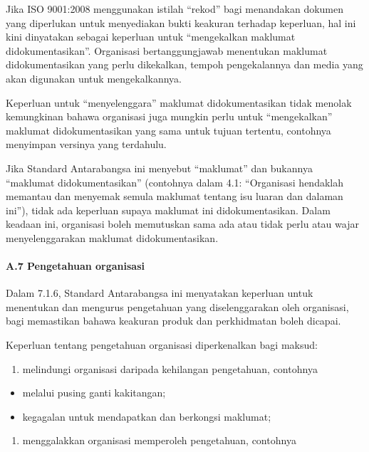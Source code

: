 \documentclass[
]{article}
\providecommand{\tightlist}{%
  \setlength{\itemsep}{0pt}\setlength{\parskip}{0pt}}
\begin{document}
Jika ISO 9001:2008 menggunakan istilah ``rekod'' bagi menandakan dokumen
yang diperlukan untuk menyediakan bukti keakuran terhadap keperluan, hal
ini kini dinyatakan sebagai keperluan untuk ``mengekalkan maklumat
didokumentasikan''. Organisasi bertanggungjawab menentukan maklumat
didokumentasikan yang perlu dikekalkan, tempoh pengekalannya dan media
yang akan digunakan untuk mengekalkannya.

Keperluan untuk ``menyelenggara'' maklumat didokumentasikan tidak
menolak kemungkinan bahawa organisasi juga mungkin perlu untuk
``mengekalkan'' maklumat didokumentasikan yang sama untuk tujuan
tertentu, contohnya menyimpan versinya yang terdahulu.

Jika Standard Antarabangsa ini menyebut ``maklumat'' dan bukannya
``maklumat didokumentasikan'' (contohnya dalam 4.1: ``Organisasi
hendaklah memantau dan menyemak semula maklumat tentang isu luaran dan
dalaman ini''), tidak ada keperluan supaya maklumat ini
didokumentasikan. Dalam keadaan ini, organisasi boleh memutuskan sama
ada atau tidak perlu atau wajar menyelenggarakan maklumat
didokumentasikan.

\hypertarget{a.7-pengetahuan-organisasi}{%
\paragraph{A.7 Pengetahuan
organisasi}\label{a.7-pengetahuan-organisasi}}

Dalam 7.1.6, Standard Antarabangsa ini menyatakan keperluan untuk
menentukan dan mengurus pengetahuan yang diselenggarakan oleh
organisasi, bagi memastikan bahawa keakuran produk dan perkhidmatan
boleh dicapai.

Keperluan tentang pengetahuan organisasi diperkenalkan bagi maksud:

\begin{enumerate}
\def\labelenumi{\alph{enumi})}
\tightlist
\item
  melindungi organisasi daripada kehilangan pengetahuan, contohnya
\end{enumerate}

\begin{itemize}
\tightlist
\item
  melalui pusing ganti kakitangan;
\item
  kegagalan untuk mendapatkan dan berkongsi maklumat;
\end{itemize}

\begin{enumerate}
\def\labelenumi{\alph{enumi})}
\setcounter{enumi}{1}
\tightlist
\item
  menggalakkan organisasi memperoleh pengetahuan, contohnya
\end{enumerate}
\end{document}
